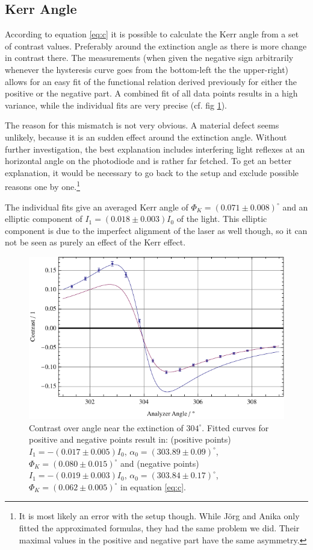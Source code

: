 \documentclass[a4paper]{scrartcl}
\numberwithin{equation}{section}
\numberwithin{figure}{section}
\numberwithin{table}{section}
\begin{document}
\subsection{Kerr Angle}
According to equation \ref{eq:c} it is possible to calculate the Kerr angle from a set of contrast values. Preferably around the extinction angle as there is more change in contrast there. The measurements (when given the negative sign arbitrarily whenever the hysteresis curve goes from the bottom-left the the upper-right) allows for an easy fit of the functional relation derived previously for either the positive or the negative part. A combined fit of all data points results in a high variance, while the individual fits are very precise (cf. fig \ref{fig:kerrangle}).

The reason for this mismatch is not very obvious. A material defect seems unlikely, because it is an sudden effect around the extinction angle. Without further investigation, the best explanation includes interfering light reflexes at an horizontal angle on the photodiode and is rather far fetched. To get an better explanation, it would be necessary to go back to the setup and exclude possible reasons one by one.\footnote{It is most likely an error with the setup though. While J\"org and Anika only fitted the approximated formulas, they had the same problem we did. Their maximal values in the positive and negative part have the same asymmetry.}

The individual fits give an averaged Kerr angle of $\Phi_K = (0.071\pm0.008)^\circ$ and an elliptic component of $I_1=(0.018\pm0.003)I_0$ of the light. This elliptic component is due to the imperfect alignment of the laser as well though, so it can not be seen as purely an effect of the Kerr effect.

\begin{figure} 
 \centering
         \includegraphics[width=0.45\linewidth]{img/kerr.pdf}
\caption{
\small Contrast over angle near the extinction of $304^\circ$. Fitted curves for positive and negative points result in: (positive points) $I_1 = -(0.017\pm0.005)I_0$, $\alpha_0=(303.89\pm 0.09)^\circ$, $\Phi_K=(0.080\pm0.015)^\circ$ and (negative points) $I_1 = -(0.019\pm0.003)I_0$, $\alpha_0=(303.84\pm 0.17)^\circ$, $\Phi_K=(0.062\pm0.005)^\circ$ in equation \ref{eq:c}. } 
	\label{fig:kerrangle}
\end{figure}
\end{document}
